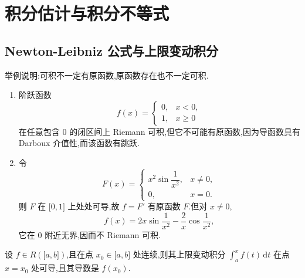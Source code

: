 \newpage

\section{积分估计与积分不等式}


\subsection{Newton-Leibniz 公式与上限变动积分}

\begin{example}
    举例说明:可积不一定有原函数,原函数存在也不一定可积.
\end{example}
\exampleblank

\begin{solution}
    \leavevmode
    \begin{enumerate}
        \item 阶跃函数
              \[
                  f(x)=
                  \begin{cases}
                      0, & x<0,   \\
                      1, & x\geq0
                  \end{cases}
              \]
              在任意包含 $0$ 的闭区间上 Riemann 可积,但它不可能有原函数,因为导函数具有 Darboux 介值性,而该函数有跳跃.

        \item 令
              \[
                  F(x)=
                  \begin{cases}
                      x^2\sin\dfrac{1}{x^2}, & x\neq0, \\
                      0,                     & x=0.
                  \end{cases}
              \]
              则 $F$ 在 $\lbrack0,1\rbrack$ 上处处可导,故 $f=F'$ 有原函数 $F$.但对 $x\neq0$,
              \[
                  f(x)=2x\sin\dfrac{1}{x^2}
                  -\dfrac{2}{x}\cos\dfrac{1}{x^2},
              \]
              它在 $0$ 附近无界,因而不 Riemann 可积.
    \end{enumerate}
\end{solution}

\begin{theorem}
    设 $f\in R(\lbrack a,b\rbrack)$,且在点 $x_0\in\lbrack a,b\rbrack$ 处连续,则其上限变动积分 $\displaystyle\int_a^x f(t)\,\mathrm{d}t$ 在点 $x=x_0$ 处可导,且其导数是 $f(x_0)$.
\end{theorem}

